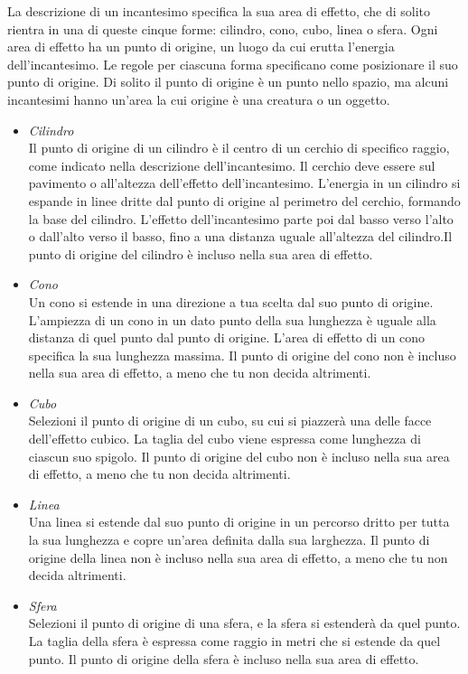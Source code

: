 La descrizione di un incantesimo specifica la sua area di effetto, che di solito rientra in una di queste cinque  forme: cilindro, cono, cubo, linea o sfera. Ogni area di  effetto ha un punto di origine, un luogo da cui erutta  l’energia dell'incantesimo. Le regole per ciascuna forma  specificano come posizionare il suo punto di origine. Di  solito il punto di origine è un punto nello spazio, ma  alcuni incantesimi hanno un'area la cui origine è una  creatura o un oggetto.\\
\begin{itemize}
\item
\textit{Cilindro}\\
Il punto di origine di un cilindro è il centro di un cerchio  di specifico raggio, come indicato nella descrizione  dell'incantesimo. Il cerchio deve essere sul pavimento o  all'altezza dell'effetto dell'incantesimo. L’energia in un  cilindro si espande in linee dritte dal punto di origine al perimetro del cerchio, formando la base del cilindro. L’effetto dell'incantesimo parte poi dal basso verso l’alto  o dall'alto verso il basso, fino a una distanza uguale  all'altezza del cilindro.Il punto di origine del cilindro è incluso nella sua area di effetto.\\
\item
\textit{Cono}\\
Un cono si estende in una direzione a tua scelta dal suo punto di origine. L’ampiezza di un cono in un dato punto della sua lunghezza è uguale alla distanza di quel punto dal punto di origine. L’area di effetto di un cono specifica la sua lunghezza massima. Il punto di origine del cono non è incluso nella sua area di effetto, a meno che tu non decida altrimenti.\\
\item
\textit{Cubo}\\
Selezioni il punto di origine di un cubo, su cui si piazzerà una delle facce dell'effetto cubico. La taglia del cubo viene espressa come lunghezza di ciascun suo spigolo. Il punto di origine del cubo non è incluso nella sua area di effetto, a meno che tu non decida altrimenti.\\
\item
\textit{Linea}\\
Una linea si estende dal suo punto di origine in un percorso dritto per tutta la sua lunghezza e copre un'area definita dalla sua larghezza. Il punto di origine della linea non è incluso nella sua area di effetto, a meno che tu non decida altrimenti.\\
\item
\textit{Sfera}\\
Selezioni il punto di origine di una sfera, e la sfera si estenderà da quel punto. La taglia della sfera è espressa come raggio in metri che si estende da quel punto.
Il punto di origine della sfera è incluso nella sua area di effetto.\\
\end{itemize}

